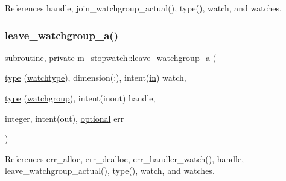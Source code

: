 References handle, join\+\_\+watchgroup\+\_\+actual(), type(), watch, and watches.

\mbox{\label{namespacem__stopwatch_af63fc0f9b537a76feec75584dfa4c95b}} 
\subsubsection{\texorpdfstring{leave\+\_\+watchgroup\+\_\+a()}{leave\_watchgroup\_a()}}
{\footnotesize\ttfamily \hyperlink{M__stopwatch_83_8txt_acfbcff50169d691ff02d4a123ed70482}{subroutine}, private m\+\_\+stopwatch\+::leave\+\_\+watchgroup\+\_\+a (\begin{DoxyParamCaption}\item[{\hyperlink{stop__watch_83_8txt_a70f0ead91c32e25323c03265aa302c1c}{type} (\hyperlink{structm__stopwatch_1_1watchtype}{watchtype}), dimension(\+:), intent(\hyperlink{M__journal_83_8txt_afce72651d1eed785a2132bee863b2f38}{in})}]{watch,  }\item[{\hyperlink{stop__watch_83_8txt_a70f0ead91c32e25323c03265aa302c1c}{type} (\hyperlink{structm__stopwatch_1_1watchgroup}{watchgroup}), intent(inout)}]{handle,  }\item[{integer, intent(out), \hyperlink{option__stopwatch_83_8txt_aa4ece75e7acf58a4843f70fe18c3ade5}{optional}}]{err }\end{DoxyParamCaption})\hspace{0.3cm}{\ttfamily [private]}}



References err\+\_\+alloc, err\+\_\+dealloc, err\+\_\+handler\+\_\+watch(), handle, leave\+\_\+watchgroup\+\_\+actual(), type(), watch, and watches.

\mbox{\label{namespacem__stopwatch_aafa77066f550b13607b7b8dd970ba1b4}} 
